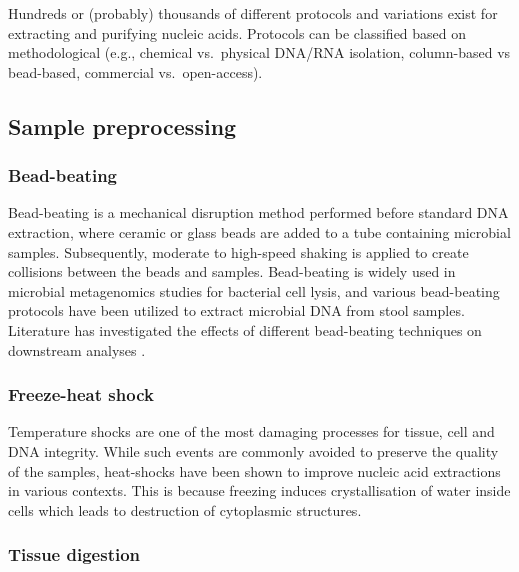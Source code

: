 \documentclass[
]{book}
\begin{document}
Hundreds or (probably) thousands of different protocols and variations exist for extracting and purifying nucleic acids. Protocols can be classified based on methodological (e.g., chemical vs.~physical DNA/RNA isolation, column-based vs bead-based, commercial vs.~open-access).

\hypertarget{sample-preprocessing}{%
\subsection*{Sample preprocessing}\label{sample-preprocessing}}

\hypertarget{bead-beating}{%
\subsubsection*{Bead-beating}\label{bead-beating}}

Bead-beating is a mechanical disruption method performed before standard DNA extraction, where ceramic or glass beads are added to a tube containing microbial samples. Subsequently, moderate to high-speed shaking is applied to create collisions between the beads and samples. Bead-beating is widely used in microbial metagenomics studies for bacterial cell lysis, and various bead-beating protocols have been utilized to extract microbial DNA from stool samples. Literature has investigated the effects of different bead-beating techniques on downstream analyses \citep[\citet{Fiedorova2019-yk}]{Zhang2021-sn}.

\hypertarget{freeze-heat-shock}{%
\subsubsection*{Freeze-heat shock}\label{freeze-heat-shock}}

Temperature shocks are one of the most damaging processes for tissue, cell and DNA integrity. While such events are commonly avoided to preserve the quality of the samples, heat-shocks have been shown to improve nucleic acid extractions in various contexts. This is because freezing induces crystallisation of water inside cells which leads to destruction of cytoplasmic structures.

\hypertarget{tissue-digestion}{%
\subsubsection*{Tissue digestion}\label{tissue-digestion}}
\end{document}
